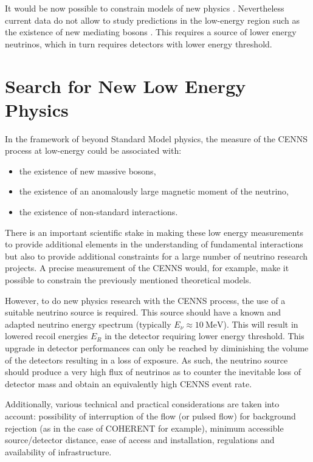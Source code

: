 It would be now possible to constrain models of new physics \cite{Akimov:2017bs}. Nevertheless current data do not allow to study predictions in the low-energy region such as the existence of new mediating bosons \cite{Billard:2018jnl}. This requires a source of lower energy neutrinos, which in turn requires detectors with lower energy threshold.


\section{Search for New Low Energy Physics}

In the framework of beyond Standard Model physics, the measure of the CENNS process at low-energy could be associated with:
\begin{itemize}
	\item the existence of new massive bosons,
	\item the existence of an anomalously large magnetic moment of the neutrino,
	\item the existence of non-standard interactions.
\end{itemize}

There is an important scientific stake in making these low energy measurements to provide additional elements in the understanding of fundamental interactions but also to provide additional constraints for a large number of neutrino research projects. A precise measurement of the CENNS would, for example, make it possible to constrain the previously mentioned theoretical models. 

However, to do new physics research with the CENNS process, the use of a suitable neutrino source is required. This source should have a known and adapted neutrino energy spectrum (typically $E_{\nu} \approx \SI{10}{\mega\eV}$). This will result in lowered recoil energies $E_R$ in the detector requiring lower energy threshold. This upgrade in detector performances can only be reached by diminishing the volume of the detectors resulting in a loss of exposure. As such, the neutrino source should produce a very high flux of neutrinos as to counter the inevitable loss of detector mass and obtain an equivalently high CENNS event rate.

Additionally, various technical and practical considerations are taken into account: possibility of interruption of the flow (or pulsed flow) for background rejection (as in the case of COHERENT for example), minimum accessible source/detector distance, ease of access and installation, regulations and availability of infrastructure.

